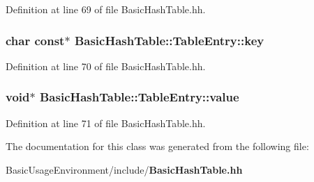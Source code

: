 Definition at line 69 of file Basic\+Hash\+Table.\+hh.

\subsubsection[{key}]{\setlength{\rightskip}{0pt plus 5cm}char const$\ast$ Basic\+Hash\+Table\+::\+Table\+Entry\+::key}\label{classBasicHashTable_1_1TableEntry_aecbd1c9e86599f9152f6e2b3cb82123b}


Definition at line 70 of file Basic\+Hash\+Table.\+hh.

\subsubsection[{value}]{\setlength{\rightskip}{0pt plus 5cm}void$\ast$ Basic\+Hash\+Table\+::\+Table\+Entry\+::value}\label{classBasicHashTable_1_1TableEntry_aa3d1ff87b9f12ac82913f29ff30c1cf3}


Definition at line 71 of file Basic\+Hash\+Table.\+hh.



The documentation for this class was generated from the following file\+:\begin{DoxyCompactItemize}
\item 
Basic\+Usage\+Environment/include/{\bf Basic\+Hash\+Table.\+hh}\end{DoxyCompactItemize}
